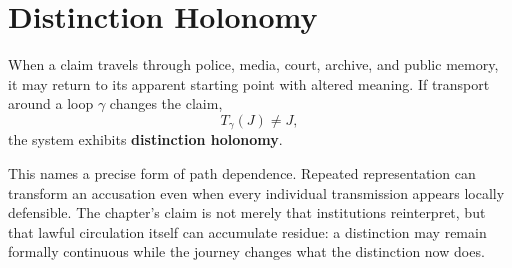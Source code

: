 
\chapter{Distinction Holonomy}
\label{ch:ch052}

When a claim travels through police, media, court, archive, and public memory, it may return to its apparent starting point with altered meaning. If transport around a loop \(\gamma\) changes the claim,
\[
T_\gamma(J)\neq J,
\]
the system exhibits \textbf{distinction holonomy}.

This names a precise form of path dependence. Repeated representation can transform an accusation even when every individual transmission appears locally defensible. The chapter's claim is not merely that institutions reinterpret, but that lawful circulation itself can accumulate residue: a distinction may remain formally continuous while the journey changes what the distinction now does.

